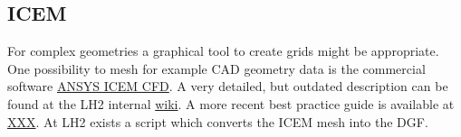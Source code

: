 \subsection{ICEM}
For complex geometries a graphical tool to create grids might be appropriate. One possibility to mesh for example CAD
geometry data is the commercial software \href{http://www.ansys.com/Products/Other+Products/ANSYS+ICEM+CFD/}{ANSYS ICEM
CFD}. A very detailed, but outdated description can be found at the LH2 internal \href{http://www.hydrosys.uni
-stuttgart.de/Intern/tiki/tiki-index.php?page=Netzgenerierung}{wiki}. A more recent best practice guide is available at
\url{XXX}. At LH2 exists a script which converts the ICEM mesh into the DGF.